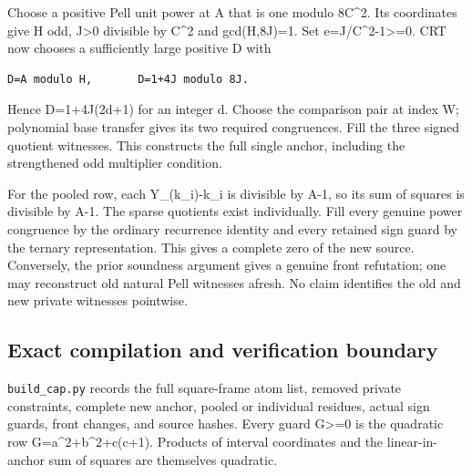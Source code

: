 Choose a positive Pell unit power at A that is one modulo 8C\textasciicircum{}\allowbreak{}2. Its coordinates give H odd, J\textgreater{}\allowbreak{}0 divisible by C\textasciicircum{}\allowbreak{}2 and gcd(H,8J)=\allowbreak{}1. Set e=\allowbreak{}J/\allowbreak{}C\textasciicircum{}\allowbreak{}2-1\textgreater{}\allowbreak{}=\allowbreak{}0. CRT now chooses a sufficiently large positive D with



\begin{verbatim}
D=A modulo H,       D=1+4J modulo 8J.
\end{verbatim}

Hence D=\allowbreak{}1+\allowbreak{}4J(2d+\allowbreak{}1) for an integer d. Choose the comparison pair at index W; polynomial base transfer gives its two required congruences. Fill the three signed quotient witnesses. This constructs the full single anchor, including the strengthened odd multiplier condition.



For the pooled row, each Y\_\allowbreak{}(k\_\allowbreak{}i)-k\_\allowbreak{}i is divisible by A-1, so its sum of squares is divisible by A-1. The sparse quotients exist individually. Fill every genuine power congruence by the ordinary recurrence identity and every retained sign guard by the ternary representation. This gives a complete zero of the new source. Conversely, the prior soundness argument gives a genuine front refutation; one may reconstruct old natural Pell witnesses afresh. No claim identifies the old and new private witnesses pointwise.



\subsection{Exact compilation and verification boundary}



\texttt{build\_\allowbreak{}cap.py} records the full square-frame atom list, removed private constraints, complete new anchor, pooled or individual residues, actual sign guards, front changes, and source hashes. Every guard G\textgreater{}\allowbreak{}=\allowbreak{}0 is the quadratic row G=\allowbreak{}a\textasciicircum{}\allowbreak{}2+\allowbreak{}b\textasciicircum{}\allowbreak{}2+\allowbreak{}c(c+\allowbreak{}1). Products of interval coordinates and the linear-in-anchor sum of squares are themselves quadratic.



